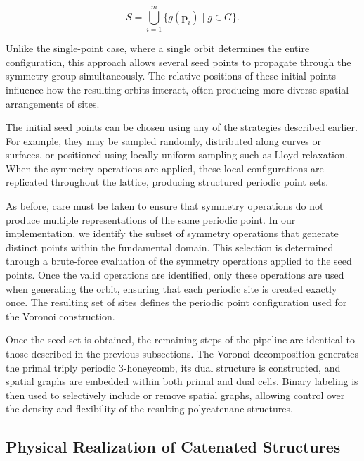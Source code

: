 \documentclass[times,twocolumn,final]{elsarticle}
\begin{document}
\[
S = \bigcup_{i=1}^{m} \{ g(\mathbf{p}_i) \mid g \in G \}.
\]

Unlike the single-point case, where a single orbit determines the
entire configuration, this approach allows several seed points to
propagate through the symmetry group simultaneously. The relative
positions of these initial points influence how the resulting orbits
interact, often producing more diverse spatial arrangements of sites.

The initial seed points can be chosen using any of the strategies
described earlier. For example, they may be sampled randomly,
distributed along curves or surfaces, or positioned using locally
uniform sampling such as Lloyd relaxation. When the symmetry
operations are applied, these local configurations are replicated
throughout the lattice, producing structured periodic point sets.



As before, care must be taken to ensure that symmetry operations do
not produce multiple representations of the same periodic point. In
our implementation, we identify the subset of symmetry operations that
generate distinct points within the fundamental domain. This selection
is determined through a brute-force evaluation of the symmetry
operations applied to the seed points. Once the valid operations are
identified, only these operations are used when generating the orbit,
ensuring that each periodic site is created exactly once. The
resulting set of sites defines the periodic point configuration used
for the Voronoi construction.

Once the seed set is obtained, the remaining steps of the pipeline
are identical to those described in the previous subsections. The
Voronoi decomposition generates the primal triply periodic
3-honeycomb, its dual structure is constructed, and spatial graphs
are embedded within both primal and dual cells. Binary labeling is
then used to selectively include or remove spatial graphs, allowing
control over the density and flexibility of the resulting
polycatenane structures.

\subsection{Physical Realization of Catenated Structures}
\end{document}
